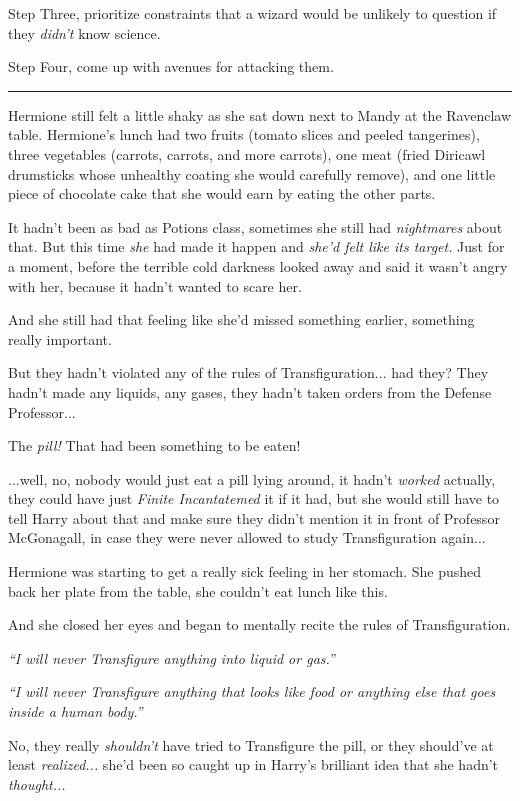 Step Three, prioritize constraints that a wizard would be unlikely to
question if they \emph{didn't} know science.

Step Four, come up with avenues for attacking them.

\begin{center}\rule{3in}{0.4pt}\end{center}

Hermione still felt a little shaky as she sat down next to Mandy at the
Ravenclaw table. Hermione's lunch had two fruits (tomato slices and
peeled tangerines), three vegetables (carrots, carrots, and more
carrots), one meat (fried Diricawl drumsticks whose unhealthy coating
she would carefully remove), and one little piece of chocolate cake that
she would earn by eating the other parts.

It hadn't been as bad as Potions class, sometimes she still had
\emph{nightmares} about that. But this time \emph{she} had made it
happen and \emph{she'd felt like its target.} Just for a moment, before
the terrible cold darkness looked away and said it wasn't angry with
her, because it hadn't wanted to scare her.

And she still had that feeling like she'd missed something earlier,
something really important.

But they hadn't violated any of the rules of Transfiguration... had
they? They hadn't made any liquids, any gases, they hadn't taken orders
from the Defense Professor...

The \emph{pill!} That had been something to be eaten!

...well, no, nobody would just eat a pill lying around, it hadn't
\emph{worked} actually, they could have just \emph{Finite Incantatemed}
it if it had, but she would still have to tell Harry about that and make
sure they didn't mention it in front of Professor McGonagall, in case
they were never allowed to study Transfiguration again...

Hermione was starting to get a really sick feeling in her stomach. She
pushed back her plate from the table, she couldn't eat lunch like this.

And she closed her eyes and began to mentally recite the rules of
Transfiguration.

\emph{``I will never Transfigure anything into liquid or gas.''}

\emph{``I will never Transfigure anything that looks like food or
anything else that goes inside a human body.''}

No, they really \emph{shouldn't} have tried to Transfigure the pill, or
they should've at least \emph{realized...} she'd been so caught up
in Harry's brilliant idea that she hadn't \emph{thought...}

